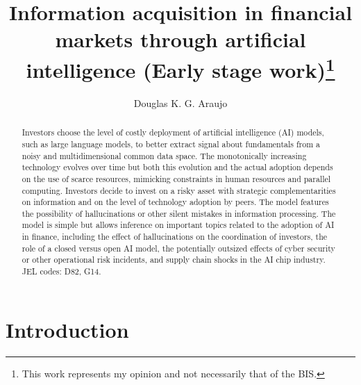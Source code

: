 \documentclass[
]{article}
\title{Information acquisition in financial markets through artificial
intelligence (Early stage work)\thanks{This work represents my opinion
and not necessarily that of the BIS.}}
\author{Douglas K. G. Araujo}
\affil{%
                  Bank for International
Settlements, douglas.araujo@bis.org
              }
\date{}
\theoremstyle{definition}
\theoremstyle{plain}
\theoremstyle{remark}
\begin{document}
\maketitle
\begin{abstract}
Investors choose the level of costly deployment of artificial
intelligence (AI) models, such as large language models, to better
extract signal about fundamentals from a noisy and multidimensional
common data space. The monotonically increasing technology evolves over
time but both this evolution and the actual adoption depends on the use
of scarce resources, mimicking constraints in human resources and
parallel computing. Investors decide to invest on a risky asset with
strategic complementarities on information and on the level of
technology adoption by peers. The model features the possibility of
hallucinations or other silent mistakes in information processing. The
model is simple but allows inference on important topics related to the
adoption of AI in finance, including the effect of hallucinations on the
coordination of investors, the role of a closed versus open AI model,
the potentially outsized effects of cyber security or other operational
risk incidents, and supply chain shocks in the AI chip industry. JEL
codes: D82, G14.
\end{abstract}

\section{Introduction}\label{introduction}
\end{document}
